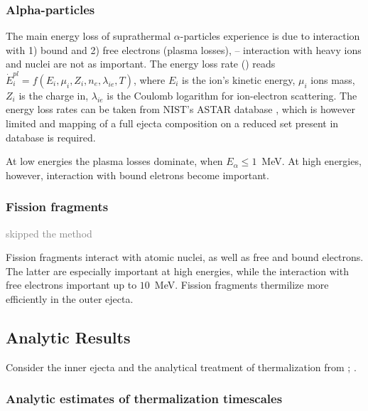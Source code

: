 \documentclass[11pt,a4paper,headinclude=true,DIV=14,BCOR=8mm,chapterprefix,listof=totoc,twoside,openright,abstracton]{scrbook}
\newcommand{\gray}[1]{\textcolor{gray}{#1}}
\begin{document}

\subsubsection{Alpha-particles}

The main energy loss of suprathermal $\alpha$-particles experience is due to interaction with 1) bound and 2) free electrons (plasma losses), -- interaction with heavy ions and nuclei are not as important. The energy loss rate (\cite{Huba, J. D. (2013)}) reads $\dot{E}_i^{pl} = f(E_i, \mu_i, Z_i, n_e, \lambda_{ie}, T)$, where $E_i$ is the ion's kinetic energy, $\mu_i$ ions mass, $Z_i$ is the charge in, $\lambda_{ie}$ is the Coulomb logarithm for ion-electron scattering. The energy loss rates can be taken from NIST’s ASTAR database \cite{(Berger et al. 2005)}, which is however limited and mapping of a full ejecta composition on a reduced set present in database is required.

At low energies the plasma losses dominate, when $E_{\alpha}\leq1$~MeV. At high energies, however, interaction with bound eletrons become important.


\subsubsection{Fission fragments}

\gray{skipped the method}

Fission fragments interact with atomic nuclei, as well as free and bound electrons. The latter are especially important at high energies, while the interaction with free electrons important up to $10$~MeV. Fission fragments thermilize more efficiently in the outer ejecta.


\subsection{Analytic Results}

Consider the inner ejecta and the analytical treatment of thermalization from \cite{Metzger et al. (2010)}; \cite{Hotokezaka et al. (2016)}.


\subsubsection{Analytic estimates of thermalization timescales}
\end{document}
